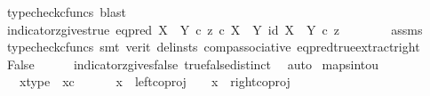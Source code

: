 \begin{isabellebody}
\ {\isacharparenleft}{\kern0pt}typecheck{\isacharunderscore}{\kern0pt}cfuncs{\isacharcomma}{\kern0pt}\ blast{\isacharparenright}{\kern0pt}\isanewline
\ \ \isamarkupfalse%
\ \isamarkupfalse%
\ indicator{\isacharunderscore}{\kern0pt}z{\isacharunderscore}{\kern0pt}gives{\isacharunderscore}{\kern0pt}true{\isacharcolon}{\kern0pt}\ {\isachardoublequoteopen}{\isacharparenleft}{\kern0pt}eq{\isacharunderscore}{\kern0pt}pred\ {\isacharparenleft}{\kern0pt}X\ {\isasymCoprod}\ Y{\isacharparenright}{\kern0pt}\ {\isasymcirc}\isactrlsub c\ {\isasymlangle}z\ {\isasymcirc}\isactrlsub c\ {\isasymbeta}\isactrlbsub X\ {\isasymCoprod}\ Y\isactrlesub {\isacharcomma}{\kern0pt}\ id\ {\isacharparenleft}{\kern0pt}X\ {\isasymCoprod}\ Y{\isacharparenright}{\kern0pt}{\isasymrangle}{\isacharparenright}{\kern0pt}\ {\isasymcirc}\isactrlsub c\ z\ {\isacharequal}{\kern0pt}\ {\isasymt}{\isachardoublequoteclose}\isanewline
\ \ \ \ \isamarkupfalse%
\ assms\ \isamarkupfalse%
\ {\isacharparenleft}{\kern0pt}typecheck{\isacharunderscore}{\kern0pt}cfuncs{\isacharcomma}{\kern0pt}\ smt\ {\isacharparenleft}{\kern0pt}verit{\isacharcomma}{\kern0pt}\ del{\isacharunderscore}{\kern0pt}insts{\isacharparenright}{\kern0pt}\ comp{\isacharunderscore}{\kern0pt}associative{}\ eq{\isacharunderscore}{\kern0pt}pred{\isacharunderscore}{\kern0pt}true{\isacharunderscore}{\kern0pt}extract{\isacharunderscore}{\kern0pt}right{\isacharparenright}{\kern0pt}\isanewline
\ \ \isamarkupfalse%
\ \isamarkupfalse%
\ False\isanewline
\ \ \ \ \isamarkupfalse%
\ indicator{\isacharunderscore}{\kern0pt}z{\isacharunderscore}{\kern0pt}gives{\isacharunderscore}{\kern0pt}false\ true{\isacharunderscore}{\kern0pt}false{\isacharunderscore}{\kern0pt}distinct\ \isamarkupfalse%
\ auto\isanewline
{}\isamarkupfalse%
%
\endisatagproof
{\isafoldproof}%
%
\isadelimproof
\isanewline
%
\endisadelimproof
\isanewline
{}\isamarkupfalse%
\ maps{\isacharunderscore}{\kern0pt}into{\isacharunderscore}{\kern0pt}{}u{}{\isacharcolon}{\kern0pt}\isanewline
\ \ \ x{\isacharunderscore}{\kern0pt}type{\isacharcolon}{\kern0pt}\ \ {\isachardoublequoteopen}x{\isasymin}\isactrlsub c\ {\isacharparenleft}{\kern0pt}{\isasymone}\ {\isasymCoprod}\ {\isasymone}{\isacharparenright}{\kern0pt}{\isachardoublequoteclose}\isanewline
\ \ \ {\isachardoublequoteopen}{\isacharparenleft}{\kern0pt}x\ {\isacharequal}{\kern0pt}\ left{\isacharunderscore}{\kern0pt}coproj\ {\isasymone}\ {\isasymone}{\isacharparenright}{\kern0pt}\ {\isasymor}\ {\isacharparenleft}{\kern0pt}x\ {\isacharequal}{\kern0pt}\ right{\isacharunderscore}{\kern0pt}coproj\ {\isasymone}\ {\isasymone}{\isacharparenright}{\kern0pt}{\isachardoublequoteclose}\isanewline

\end{isabellebody}
